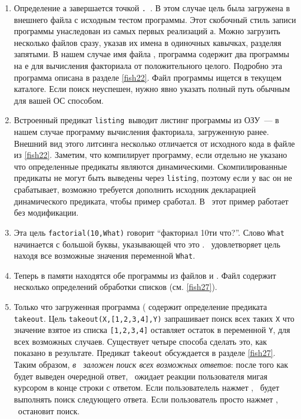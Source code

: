 \begin{enumerate}
  \item
Определение  \prolog а завершается точкой \verb|.|\ .
В этом случае цель была загружена в внешнего файла с исходным тестом программы.
Этот скобочный стиль записи программы унаследован из самых первых реализаций
\prolog а. Можно загрузить несколько файлов сразу, указав их имена в одиночных
кавычках, разделяя запятыми. В нашем случае имя файла , программа
содержит два программы на \prolog е для вычисления факториала от положительного
целого. Подробно эта программа описана в разделе \ref{fish22}. Файл программы
ищется в текущем каталоге. Если поиск неуспешен, нужно явно указать полный путь
обычным для вашей ОС способом.

\item 
Встроенный предикат \verb|listing|\ выводит листинг программы из ОЗУ\ --- в
нашем случае программу вычисления факториала, загруженную ранее. Внешний вид
этого литсинга несколько отличается от исходного кода в файле из \ref{fish22}.
Заметим, что  компилирует программу, если отдельно не
указано что определенные предикаты являются динамическими. Скомпилированные
предикаты не могут быть выведены через \verb|listing|, поэтому если у вас он не
срабатывает, возможно требуется дополнить исходник декларацией динамического
предиката, чтобы пример сработал. В \ этот пример работает без
модификации.

  \item 
Эта цель \verb|factorial(10,What)| говорит ``факториал 10ти что?''. Слово
\verb|What| начинается с большой буквы, указывающей что это . \prolog\ удовлетворяет цель находя все
возможные значения переменной \verb|What|.

  \item
Теперь в памяти находятся обе программы из файлов  и
. Файл  содержит несколько определений обработки
списков (см. \ref{fish27}).

  \item 
Только что загруженная программа ( содержит определение предиката
\verb|takeout|. Цель \verb|takeout(X,[1,2,3,4],Y)| запрашивает поиск всех таких
\verb|X| что значение взятое из списка \verb|[1,2,3,4]| оставляет остаток в
переменной \verb|Y|, для всех возможных случаев. Существует четыре способа
сделать это, как показано в результате.  Предикат \verb|takeout| обсуждается в
разделе \ref{fish27}. Таким образом, \emph{в \prolog\ заложен поиск всех
возможных ответов}: после того как будет выведен очередной ответ, \prolog\
ожидает реакции пользователя мигая курсором в конце строки с ответом. Если
пользователель нажмет \keys{;}, \prolog\ будет выполнять поиск следующего
ответа. Если пользователь просто нажмет \keys{Enter}, \prolog\ остановит поиск.


\end{enumerate}
